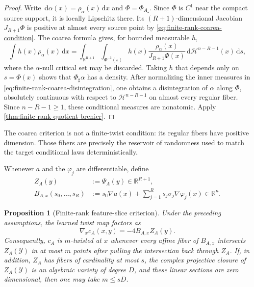 \documentclass[11pt,a4paper]{article}
\newtheorem{proposition}[theorem]{Proposition}
\theoremstyle{definition}
\theoremstyle{remark}
\newcommand{\R}{\mathbb R}
\newcommand{\dd}{\,\mathrm d}
\begin{document}
\begin{proof}
Write \(\dd\alpha(x)=\rho_\alpha(x)\dd x\) and
\(\Phi=\Phi_{A_\star}\).  Since \(\Phi\) is \(C^1\) near the compact source
support, it is locally Lipschitz there.  Its \((R+1)\)-dimensional Jacobian
\(J_{R+1}\Phi\) is positive at almost every source point by
\eqref{eq:finite-rank-coarea-condition}.  The coarea formula
\citep{EvansGariepy2015} gives, for bounded measurable \(h\),
\begin{equation}
  \int h(x)\rho_\alpha(x)\dd x
  =\int_{\R^{R+1}}
    \int_{\Phi^{-1}(s)}
      h(x)\frac{\rho_\alpha(x)}{J_{R+1}\Phi(x)}
      \dd\mathcal H^{n-R-1}(x)\dd s,
  \label{eq:finite-rank-coarea-disintegration}
\end{equation}
where the \(\alpha\)-null critical set may be discarded.  Taking \(h\) that
depends only on \(s=\Phi(x)\) shows that \(\Phi_\sharp\alpha\) has a density.
After normalizing the inner measures in
\eqref{eq:finite-rank-coarea-disintegration}, one obtains a disintegration of
\(\alpha\) along \(\Phi\), absolutely continuous with respect to
\(\mathcal H^{n-R-1}\) on almost every regular fiber.  Since
\(n-R-1\geq1\), these conditional measures are nonatomic.  Apply
\cref{thm:finite-rank-quotient-brenier}.
\end{proof}

The coarea criterion is not a finite-twist condition: its regular fibers have
positive dimension.  Those fibers are precisely the reservoir of randomness
used to match the target conditional laws deterministically.

Whenever \(a\) and the \(\varphi_j\) are differentiable, define
\begin{align}
  Z_A(y)&:=\Psi_A(y)\in\R^{R+1},
  \label{eq:augmented-target-feature}\\
  B_{A,x}(s_0,\ldots,s_R)
    &:=s_0\nabla a(x)+\sum_{j=1}^R
      s_j\sigma_j\nabla\varphi_j(x)
      \in\R^n.
  \label{eq:feature-projection-operator}
\end{align}

\begin{proposition}[Finite-rank feature-slice criterion]
\label{prop:finite-rank-feature-slices}
Under the preceding assumptions, the learned twist map factors as
\begin{equation}
  \nabla_xc_A(x,y)=-4B_{A,x}Z_A(y).
  \label{eq:finite-rank-twist-factorization}
\end{equation}
Consequently, \(c_A\) is \(m\)-twisted at \(x\) whenever every affine fiber
of \(B_{A,x}\) intersects \(Z_A(\mathcal Y)\) in at most \(m\) points after
pulling the intersection back through \(Z_A\).  If, in addition, \(Z_A\) has
fibers of cardinality at most \(s\), the complex projective closure of
\(Z_A(\mathcal Y)\) is an algebraic variety of degree \(D\), and these linear
sections are zero dimensional, then one may take \(m\leq sD\).
\end{proposition}
\end{document}

